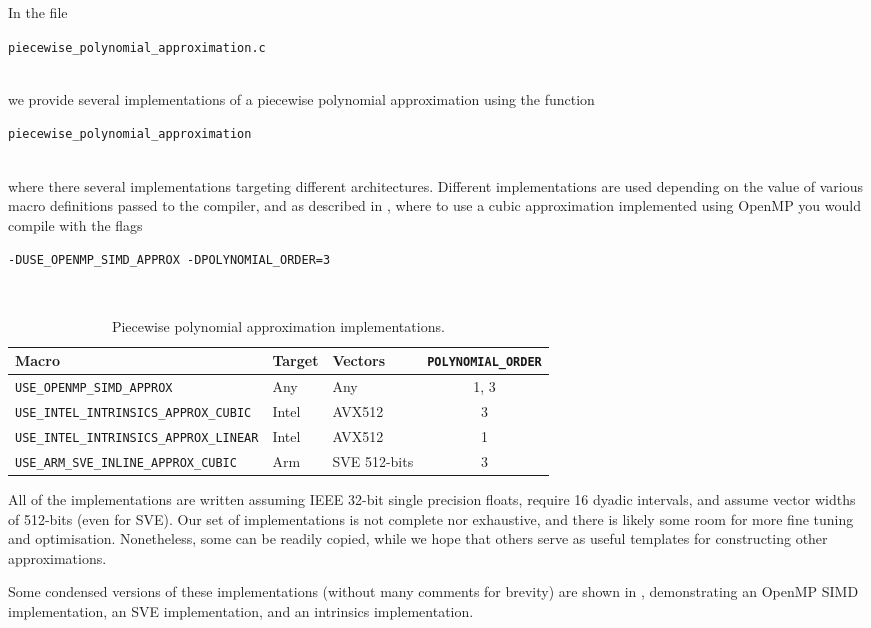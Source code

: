 \documentclass[11pt,a4paper,oneside,english]{extarticle}
\newcommand{\singlecodeline}[1]{\\[1em]\centerline{\lstinline[basicstyle=\ttfamily]$#1$}\\[1em]}
\begin{document}
In the file \singlecodeline{piecewise_polynomial_approximation.c} we provide several implementations of a piecewise polynomial approximation using the function \singlecodeline{piecewise_polynomial_approximation}
where there several implementations targeting different architectures. Different implementations are used depending on the value of various macro definitions passed to the compiler, and as described in , where to use a cubic approximation implemented using OpenMP you would compile with the flags
\singlecodeline{-DUSE_OPENMP_SIMD_APPROX -DPOLYNOMIAL_ORDER=3}

\begin{table}[htb]
\centering
\begin{tabular}{lllc}
Macro & Target & Vectors &  \verb|POLYNOMIAL_ORDER| \\
\hline
\verb|USE_OPENMP_SIMD_APPROX|  & Any & Any & 1, 3\\
\verb|USE_INTEL_INTRINSICS_APPROX_CUBIC| & Intel & AVX512& 3\\
\verb|USE_INTEL_INTRINSICS_APPROX_LINEAR| &Intel &  AVX512 & 1\\
\verb|USE_ARM_SVE_INLINE_APPROX_CUBIC| & Arm & SVE 512-bits & 3 \\
\end{tabular}
\caption{Piecewise polynomial approximation implementations.}
\label{tab:piecewise_polynomial_approximation_implementations}
\end{table} 

All of the implementations are written assuming IEEE 32-bit single precision floats, require 16 dyadic intervals, and assume vector widths of 512-bits (even for SVE). Our set of implementations is not complete nor exhaustive, and there is likely some room for more fine tuning and optimisation. Nonetheless, some can be readily copied, while we hope that others serve as useful templates for constructing other approximations. 

Some condensed versions of these implementations (without many comments for brevity) are shown in , demonstrating an OpenMP SIMD implementation, an \arm SVE implementation, and an \intel intrinsics implementation. 
\end{document}
